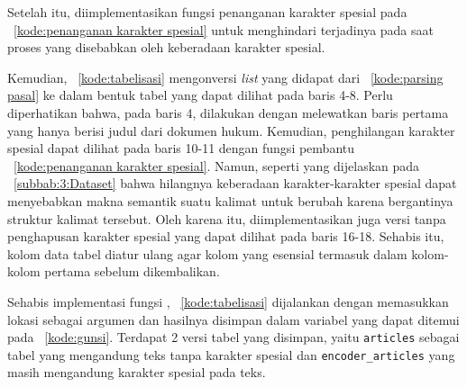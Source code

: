 Setelah itu, diimplementasikan fungsi penanganan karakter spesial pada \kode{}~\ref{kode:penanganan karakter spesial} untuk menghindari terjadinya \error{} pada saat proses \retrieval{} yang disebabkan oleh keberadaan karakter spesial.


Kemudian, \kode{}~\ref{kode:tabelisasi} mengonversi \textit{list} yang didapat dari \kode{}~\ref{kode:parsing pasal} ke dalam bentuk tabel yang dapat dilihat pada baris 4-8. Perlu diperhatikan bahwa, pada baris 4, \parsing{} dilakukan dengan melewatkan baris pertama yang hanya berisi judul dari dokumen hukum. Kemudian, penghilangan karakter spesial dapat dilihat pada baris 10-11 dengan fungsi pembantu \kode{}~\ref{kode:penanganan karakter spesial}. Namun, seperti yang dijelaskan pada \subbab{}~\ref{subbab:3:Dataset} bahwa hilangnya keberadaan karakter-karakter spesial dapat menyebabkan makna semantik suatu kalimat untuk berubah karena bergantinya struktur kalimat tersebut. Oleh karena itu, diimplementasikan juga versi tanpa penghapusan karakter spesial yang dapat dilihat pada baris 16-18. Sehabis itu, kolom data tabel diatur ulang agar kolom yang esensial termasuk dalam kolom-kolom pertama sebelum dikembalikan.


Sehabis implementasi fungsi \parsing{}, \kode{}~\ref{kode:tabelisasi} dijalankan dengan memasukkan lokasi \txt{} \file{} sebagai argumen dan hasilnya disimpan dalam variabel yang dapat ditemui pada \kode{}~\ref{kode:gunsi}. Terdapat 2 versi tabel yang disimpan, yaitu \lstinline{articles} sebagai tabel yang mengandung teks tanpa karakter spesial dan \lstinline{encoder_articles} yang masih mengandung karakter spesial pada teks.


